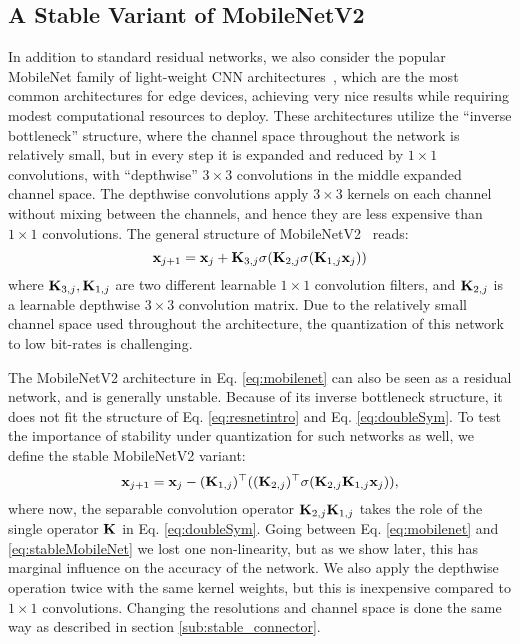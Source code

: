 \documentclass[reqno]{amsart}
\newcommand{\bfx}{ {\bf x}}
\newcommand{\bfK}{{\bf K}}
\begin{document}
\subsection{\textbf{A Stable Variant of MobileNetV2}}
\label{sub:mobilenet}
In addition to standard residual networks, we also consider the popular MobileNet family of light-weight CNN architectures~\cite{sandler2018mobilenetv2,howard2019searching}, which are the most common architectures for edge devices, achieving very nice results while requiring modest computational resources to deploy. These architectures utilize the ``inverse bottleneck'' structure, where the channel space throughout the network is relatively small, but in every step it is expanded and reduced by $1\times1$ convolutions, with ``depthwise'' $3\times 3$ convolutions in the middle expanded channel space. The depthwise convolutions apply $3\times3$ kernels on each channel without mixing between the channels, and hence they are less expensive than $1\times1$ convolutions. The general structure of MobileNetV2~\cite{sandler2018mobilenetv2} reads:
\begin{equation}
\label{eq:mobilenet}
    \bfx_{j+1} = \bfx_j + \bfK_{3, j}\sigma(\bfK_{2, j}\sigma(\bfK_{1, j}\bfx_j))
\end{equation}
where $\bfK_{3, j},\bfK_{1, j}$ are two different learnable $1 \times 1$ convolution filters, and $\bfK_{2, j}$ is a learnable depthwise $3 \times 3$ convolution matrix. Due to the relatively small channel space used throughout the architecture, the quantization of this network to low bit-rates is challenging.   

The MobileNetV2 architecture in Eq. \eqref{eq:mobilenet} can also be seen as a residual network, and is generally unstable. Because of its inverse bottleneck structure, it does not fit the structure of Eq. \eqref{eq:resnetintro} and Eq. \eqref{eq:doubleSym}. To test the importance of stability under quantization for such networks as well, we define the stable MobileNetV2 variant:
\begin{equation}
\label{eq:stableMobileNet}
    \bfx_{j+1} = \bfx_j - (\bfK_{1, j})^\top((\bfK_{2, j})^\top\sigma (\bfK_{2, j}\bfK_{1, j}\bfx_j)),    
\end{equation}
where now, the separable convolution operator $\bfK_{2, j}\bfK_{1, j}$ takes the role of the single operator $\bfK$ in Eq. \eqref{eq:doubleSym}. Going between Eq. \eqref{eq:mobilenet} and \eqref{eq:stableMobileNet} we lost one non-linearity, but as we show later, this has marginal influence on the accuracy of the network. We also apply the depthwise operation twice with the same kernel weights, but this is inexpensive compared to $1\times1$ convolutions. Changing the resolutions and channel space is done the same way as described in section \ref{sub:stable_connector}.  
\end{document}
